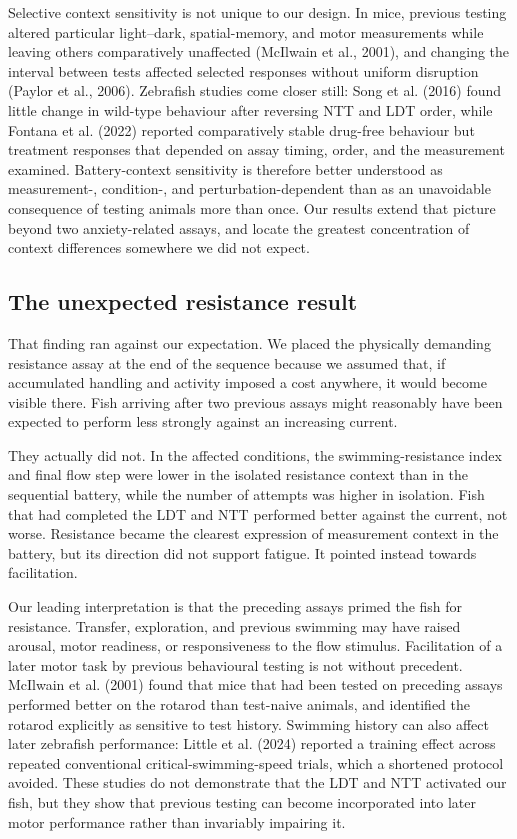 \documentclass[12pt,a4paper]{article}
\begin{document}
Selective context sensitivity is not unique to our design. In mice, previous testing altered particular light--dark, spatial-memory, and motor measurements while leaving others comparatively unaffected (McIlwain et al., 2001), and changing the interval between tests affected selected responses without uniform disruption (Paylor et al., 2006). Zebrafish studies come closer still: Song et al. (2016) found little change in wild-type behaviour after reversing NTT and LDT order, while Fontana et al. (2022) reported comparatively stable drug-free behaviour but treatment responses that depended on assay timing, order, and the measurement examined. Battery-context sensitivity is therefore better understood as measurement-, condition-, and perturbation-dependent than as an unavoidable consequence of testing animals more than once. Our results extend that picture beyond two anxiety-related assays, and locate the greatest concentration of context differences somewhere we did not expect.

\subsection{The unexpected resistance result}

That finding ran against our expectation. We placed the physically demanding resistance assay at the end of the sequence because we assumed that, if accumulated handling and activity imposed a cost anywhere, it would become visible there. Fish arriving after two previous assays might reasonably have been expected to perform less strongly against an increasing current.

They actually did not. In the affected conditions, the swimming-resistance index and final flow step were lower in the isolated resistance context than in the sequential battery, while the number of attempts was higher in isolation. Fish that had completed the LDT and NTT performed better against the current, not worse. Resistance became the clearest expression of measurement context in the battery, but its direction did not support fatigue. It pointed instead towards facilitation.

Our leading interpretation is that the preceding assays primed the fish for resistance. Transfer, exploration, and previous swimming may have raised arousal, motor readiness, or responsiveness to the flow stimulus. Facilitation of a later motor task by previous behavioural testing is not without precedent. McIlwain et al. (2001) found that mice that had been tested on preceding assays performed better on the rotarod than test-naive animals, and identified the rotarod explicitly as sensitive to test history. Swimming history can also affect later zebrafish performance: Little et al. (2024) reported a training effect across repeated conventional critical-swimming-speed trials, which a shortened protocol avoided. These studies do not demonstrate that the LDT and NTT activated our fish, but they show that previous testing can become incorporated into later motor performance rather than invariably impairing it.
\end{document}
